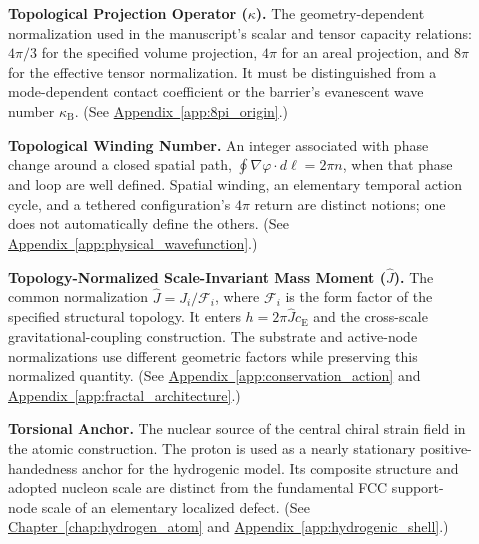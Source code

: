 \begin{description}
\item[] \begin{minipage}[t]{\linewidth}
\textbf{Topological Projection Operator ($\kappa$).} The geometry-dependent normalization used in the manuscript's scalar and tensor capacity relations: $4\pi/3$ for the specified volume projection, $4\pi$ for an areal projection, and $8\pi$ for the effective tensor normalization. It must be distinguished from a mode-dependent contact coefficient or the barrier's evanescent wave number $\kappa_{\mathrm B}$.
(See \hyperref[app:8pi_origin]{Appendix~\ref*{app:8pi_origin}}.)
\end{minipage}

\item[] \begin{minipage}[t]{\linewidth}
\textbf{Topological Winding Number.} An integer associated with phase change around a closed spatial path, $\oint\nabla\varphi\cdot d\boldsymbol\ell=2\pi n$, when that phase and loop are well defined. Spatial winding, an elementary temporal action cycle, and a tethered configuration's $4\pi$ return are distinct notions; one does not automatically define the others.
(See \hyperref[app:physical_wavefunction]{Appendix~\ref*{app:physical_wavefunction}}.)
\end{minipage}

\item[] \begin{minipage}[t]{\linewidth}
\textbf{Topology-Normalized Scale-Invariant Mass Moment ($\hat J$).} The common normalization $\hat J=J_i/\mathcal F_i$, where $\mathcal F_i$ is the form factor of the specified structural topology. It enters $h=2\pi\hat Jc_{\mathrm E}$ and the cross-scale gravitational-coupling construction. The substrate and active-node normalizations use different geometric factors while preserving this normalized quantity.
(See \hyperref[app:conservation_action]{Appendix~\ref*{app:conservation_action}} and \hyperref[app:fractal_architecture]{Appendix~\ref*{app:fractal_architecture}}.)
\end{minipage}

\item[] \begin{minipage}[t]{\linewidth}
\textbf{Torsional Anchor.} The nuclear source of the central chiral strain field in the atomic construction. The proton is used as a nearly stationary positive-handedness anchor for the hydrogenic model. Its composite structure and adopted nucleon scale are distinct from the fundamental FCC support-node scale of an elementary localized defect.
(See \hyperref[chap:hydrogen_atom]{Chapter~\ref*{chap:hydrogen_atom}} and \hyperref[app:hydrogenic_shell]{Appendix~\ref*{app:hydrogenic_shell}}.)
\end{minipage}


\end{description}

